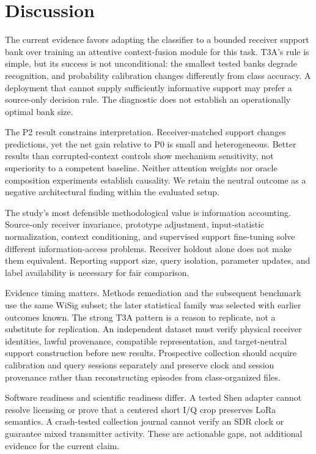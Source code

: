 \section{Discussion}
The current evidence favors adapting the classifier to a bounded receiver support bank over training an attentive context-fusion module for this task. T3A's rule is simple, but its success is not unconditional: the smallest tested banks degrade recognition, and probability calibration changes differently from class accuracy. A deployment that cannot supply sufficiently informative support may prefer a source-only decision rule. The diagnostic does not establish an operationally optimal bank size.

The P2 result constrains interpretation. Receiver-matched support changes predictions, yet the net gain relative to P0 is small and heterogeneous. Better results than corrupted-context controls show mechanism sensitivity, not superiority to a competent baseline. Neither attention weights nor oracle composition experiments establish causality. We retain the neutral outcome as a negative architectural finding within the evaluated setup.

The study's most defensible methodological value is information accounting. Source-only receiver invariance, prototype adjustment, input-statistic normalization, context conditioning, and supervised support fine-tuning solve different information-access problems. Receiver holdout alone does not make them equivalent. Reporting support size, query isolation, parameter updates, and label availability is necessary for fair comparison.

Evidence timing matters. Methods remediation and the subsequent benchmark use the same WiSig subset; the later statistical family was selected with earlier outcomes known. The strong T3A pattern is a reason to replicate, not a substitute for replication. An independent dataset must verify physical receiver identities, lawful provenance, compatible representation, and target-neutral support construction before new results. Prospective collection should acquire calibration and query sessions separately and preserve clock and session provenance rather than reconstructing episodes from class-organized files.

Software readiness and scientific readiness differ. A tested Shen adapter cannot resolve licensing or prove that a centered short I/Q crop preserves LoRa semantics. A crash-tested collection journal cannot verify an SDR clock or guarantee mixed transmitter activity. These are actionable gaps, not additional evidence for the current claim.
